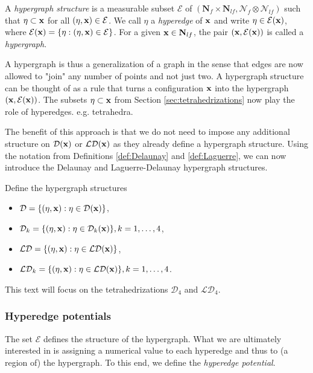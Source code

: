 \begin{definition}
	A \textit{hypergraph structure} is a measurable subset $\mathcal E$ of $(\mathbf N_f\times \mathbf N_{lf}, \mathcal N_f \otimes \mathcal N_{lf})$ such that $\eta \subset {\mathbf{x}}$ for all $(\eta,{\mathbf{x}})\in\mathcal E$. We call $\eta$ a \textit{hyperedge} of ${\mathbf{x}}$ and write $\eta \in \mathcal E({\mathbf{x}})$, where $\mathcal E({\mathbf{x}}) = \{\eta: (\eta,{\mathbf{x}}) \in \mathcal E\}$. For a given ${\mathbf{x}} \in \mathbf N_{lf}$, the pair $({\mathbf{x}}, \mathcal E({\mathbf{x}}))$ is called a \textit{hypergraph}.
\end{definition}
A hypergraph is thus a generalization of a graph in the sense that edges are now allowed to "join" any number of points and not just two. A hypergraph structure can be thought of as a rule that turns a configuration ${\mathbf{x}}$ into the hypergraph $({\mathbf{x}},\mathcal E({\mathbf{x}}))$. 
The subsets $\eta \subset {\mathbf{x}}$ from Section \ref{sec:tetrahedrizations} now play the role of hyperedges. e.g. tetrahedra.

The benefit of this approach is that we do not need to impose any additional structure on $\mathcal D({\mathbf{x}})$ or $\mathcal {LD}({\mathbf{x}})$ as they already define a hypergraph structure. Using the notation from Definitions \ref{def:Delaunay} and \ref{def:Laguerre}, we can now introduce the Delaunay and Laguerre-Delaunay hypergraph structures. 

\begin{definition}
	Define the hypergraph structures
	\begin{itemize}
		\item $\mathcal D = \{(\eta,{\mathbf{x}}): \eta \in \mathcal D({\mathbf{x}})\}$,
		\item 	$\mathcal D_k = \{(\eta,{\mathbf{x}}): \eta \in \mathcal D_k({\mathbf{x}})\}, k=1,\dots,4$,
		\item 	$\mathcal {LD} = \{(\eta,{\mathbf{x}}): \eta \in \mathcal {LD}({\mathbf{x}})\}$,
		\item 	$\mathcal {LD}_k = \{(\eta,{\mathbf{x}}): \eta \in \mathcal {LD}({\mathbf{x}})\}, k=1,\dots,4$.
	\end{itemize}
\end{definition}

This text will focus on the tetrahedrizations $\mathcal {D}_4$ and $\mathcal {LD}_4$.

\subsubsection{Hyperedge potentials}
The set $\mathcal E$ defines the structure of the hypergraph. What we are ultimately interested in is assigning a numerical value to each hyperedge and thus to (a region of) the hypergraph. To this end, we define the \textit{hyperedge potential}.


